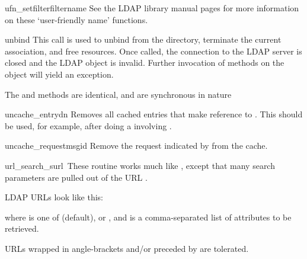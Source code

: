 
\begin{methoddesc}{ufn_setfilter}{filtername}
See the LDAP library manual pages for more information on these
`user-friendly name' functions.
\end{methoddesc}


\begin{methoddesc}[int]{unbind}{}
This call is used to unbind from the directory, terminate the current
association, and free resources. Once called, the connection to the
LDAP server is closed and the LDAP object is invalid. Further invocation
of methods on the object will yield an exception.

The  and  methods are identical, and are 
synchronous in nature
\end{methoddesc}


\begin{methoddesc}{uncache_entry}{dn}
Removes all cached entries that make reference to . This should be
used, for example, after doing a  involving .
\end{methoddesc}


\begin{methoddesc}{uncache_request}{msgid}
Remove the request indicated by  from the cache.
\end{methoddesc}


\begin{methoddesc}{url_search_s}{url\, }
These routine works much like , except that many search
parameters are pulled out of the URL . 

LDAP URLs look like this: 


where  is one of  (default),  or ,
and  is a comma-separated list of attributes to be retrieved.

URLs wrapped in angle-brackets and/or preceded by  are 
tolerated.
\end{methoddesc}


